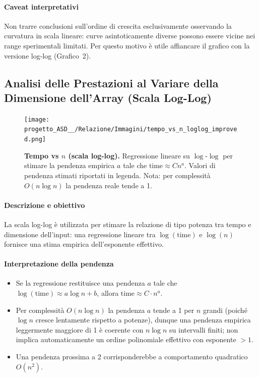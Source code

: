 \documentclass[a4paper, 11pt]{article}
\begin{document}
\paragraph{Caveat interpretativi}
Non trarre conclusioni sull'ordine di crescita esclusivamente osservando la curvatura in scala lineare: curve asintoticamente diverse possono essere vicine nei range sperimentali limitati. Per questo motivo è utile affiancare il grafico con la versione log-log (Grafico~2).

\subsection{Analisi delle Prestazioni al Variare della Dimensione dell'Array (Scala Log-Log)}
\begin{figure}[H]
\centering
\texttt{[image: progetto\_ASD\_\_/Relazione/Immagini/tempo\_vs\_n\_loglog\_improved.png]}
\caption{\textbf{Tempo vs \(n\) (scala log-log).} Regressione lineare su \(\log\)-\(\log\) per stimare la pendenza empirica \(a\) tale che \(\text{time}\approx C n^{a}\). Valori di pendenza stimati riportati in legenda. Nota: per complessità \(O(n\log n)\) la pendenza reale tende a 1.}
\label{fig:variazione_m}
\end{figure}

\paragraph{Descrizione e obiettivo}
La scala log-log è utilizzata per stimare la relazione di tipo potenza tra tempo e dimensione dell'input: una regressione lineare tra \(\log(\text{time})\) e \(\log(n)\) fornisce una stima empirica dell'esponente effettivo.

\paragraph{Interpretazione della pendenza}
\begin{itemize}
  \item Se la regressione restituisce una pendenza \(a\) tale che \(\log(\text{time}) \approx a\log n + b\), allora \(\text{time} \approx C\cdot n^{a}\).
  \item Per complessità \(O(n\log n)\) la pendenza \(a\) tende a 1 per \(n\) grandi (poiché \(\log n\) cresce lentamente rispetto a potenze), dunque una pendenza empirica leggermente maggiore di 1 è coerente con \(n\log n\) su intervalli finiti; non implica automaticamente un ordine polinomiale effettivo con esponente \(>1\).
  \item Una pendenza prossima a 2 corrisponderebbe a comportamento quadratico \(O(n^2)\).
\end{itemize}
\end{document}
